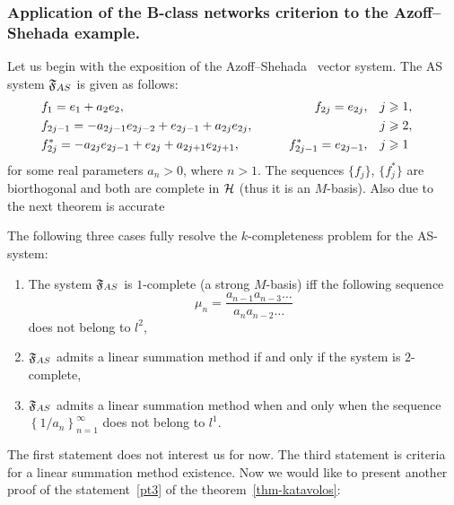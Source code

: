\documentclass[12pt]{article}
\begin{document}
    \subsubsection{Application of the B-class networks criterion to the Azoff--Shehada example.}
      Let us begin with the exposition of the Azoff--Shehada~\cite{azoff} vector system.
      The AS system $\fsys_{AS}$ is given as follows:
      \begin{equation}
        \label{as-system}
        \begin{aligned}
          &f_1 = e_1 + a_2 e_2, \qquad &f_{2j}=e_{2j}, \quad&j \geq 1,&\\
          &f_{2j-1}=-a_{2j-1}e_{2j-2} + e_{2j-1} + a_{2j}e_{2j}, \qquad &\makebox[5em]{} \quad&j \geq 2,&\\
          &f^*_{2j}=-a_{2j}e_{2j-1}+e_{2j}+a_{2j+1}e_{2j+1}, \qquad &f^*_{2j-1}=e_{2j-1}, \quad&j \geq 1&
        \end{aligned}
      \end{equation}
        for some real parameters $a_n > 0$, where $n > 1$.
      The sequences $\{f_j\}$, $\{f^*_j\}$ are biorthogonal and both are complete in $\cal{H}$ (thus it is an $M$-basis).
      Also due to~\cite{katavolos} the next theorem is accurate
      \begin{theorem}
        \label{thm-katavolos}
        The following three cases fully resolve the $k$-completeness problem for the AS-system:
        \begin{enumerate}[label=(\alph*)]
          \item The system $\fsys_{AS}$ is $1$-complete (a strong $M$-basis) iff the following sequence
            \begin{equation*}
              \mu_n = \frac{a_{n-1} a_{n-3} \dots}{a_{n} a_{n-2} \dots }
            \end{equation*}
              does not belong to $l^2$,
          \item \label{pt2} $\fsys_{AS}$ admits a linear summation method if and only if the system is $2$-complete,
          \item \label{pt3} $\fsys_{AS}$ admits a linear summation method when and only when
            the sequence $\left\{1/a_n\right\}_{n=1}^\infty$ does not belong to $l^1$.
        \end{enumerate}
      \end{theorem}
      The first statement does not interest us for now.
      The third statement is criteria for a linear summation method existence.
      Now we would like to present another proof of the statement~\ref{pt3} of the theorem~\ref{thm-katavolos}:
\end{document}
